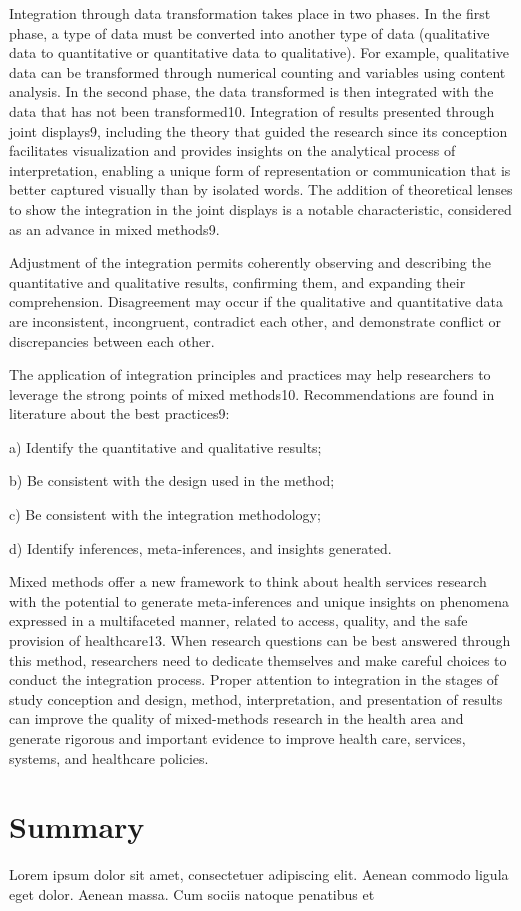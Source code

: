Integration through data transformation takes place in two phases. In the first phase, a type of data must be converted into another type of data (qualitative data to quantitative or quantitative data to qualitative). For example, qualitative data can be transformed through numerical counting and variables using content analysis. In the second phase, the data transformed is then integrated with the data that has not been transformed10. Integration of results presented through joint displays9, including the theory that guided the research since its conception facilitates visualization and provides insights on the analytical process of interpretation, enabling a unique form of representation or communication that is better captured visually than by isolated words. The addition of theoretical lenses to show  the integration in the joint displays is a notable characteristic, considered as an advance in mixed methods9.

Adjustment of the integration permits coherently observing and describing the quantitative and qualitative results, confirming them, and expanding their comprehension. Disagreement may occur if the qualitative and quantitative data are inconsistent, incongruent, contradict each other, and demonstrate conflict or discrepancies between each other.

The application of integration principles and practices may help researchers to leverage the strong points of mixed methods10. Recommendations are found in literature about the best practices9:

a) Identify the quantitative and qualitative results;

b) Be consistent with the design used in the method;

c) Be consistent with the integration methodology;

d) Identify inferences, meta-inferences, and insights generated.

Mixed methods offer a new framework to think about health services research with the potential to generate meta-inferences and unique insights on phenomena expressed in a multifaceted manner, related to access, quality, and the safe provision of healthcare13. When research questions can be best answered through this method, researchers need to dedicate themselves and make careful choices to conduct the integration process. Proper attention to integration in the stages of study conception and design, method, interpretation, and presentation of results can improve the quality of mixed-methods research in the health area and generate rigorous and important evidence to improve health care, services, systems, and healthcare policies.



\section{Summary}\label{ch14:summary}

Lorem ipsum dolor sit amet, consectetuer adipiscing elit. Aenean commodo ligula eget dolor. Aenean massa. Cum sociis natoque penatibus et
